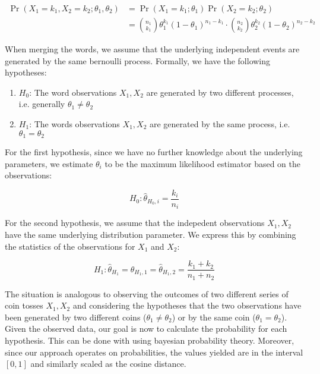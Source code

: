 \begin{equation*}
\begin{split}
	\Pr(X_1 = k_1, X_2 = k_2; \theta_1, \theta_2) &=
	\Pr(X_1=k_1;\theta_1)\Pr(X_2=k_2;\theta_2)
	\\
	&= 	\binom{n_1}{k_1}\theta_1^{k_1}(1-\theta_1)^{n_1-k_1} \cdot
	\binom{n_2}{k_2}\theta_2^{k_2}(1-\theta_2)^{n_2-k_2}
\end{split}
\end{equation*}

When merging the words, we assume that the underlying independent events are
generated by the same bernoulli process. Formally, we have the following hypotheses: 

\begin{enumerate}
  \item $H_0$: The word observations $X_1, X_2$ are generated by two different
  processes, i.e.  generally $\theta_1 \neq \theta_2$
  \item $H_1$: The words observations $X_1, X_2$ are generated by the same
  process, i.e. $\theta_1 = \theta_2$
\end{enumerate}

For the first hypothesis, since we have no further knowledge about the
underlying parameters, we estimate $\theta_i$ to be the maximum likelihood 
estimator based on the observations: 

\begin{equation*}
	H_0: \hat{\theta}_{H_0,i} = \frac{k_i}{n_i}
\end{equation*}

For the second hypothesis, we assume that the indepedent observations $X_1, X_2$
have the same underlying distribution parameter. We express this by combining
the statistics of the observations for $X_1$ and $X_2$:

\begin{equation*}
H_1: \hat{\theta}_{H_1} =\hat{\theta}_{H_1,1} =
\hat{\theta}_{H_1,2} =
\frac{k_1 + k_2}{n_1 + n_2}
\end{equation*}
 
The situation is analogous to observing the outcomes of two different series of
coin tosses $X_1, X_2$ and considering the hypotheses that the two
observations have been generated by two different coins ($\theta_1 \neq \theta_2$) or by the same coin
($\theta_1 = \theta_2$). Given the observed data, our goal is now to calculate
the probability for each hypothesis. This can be done with using bayesian probability theory.
Moreover, since our approach operates on probabilities, the values yielded are
in the interval $[0, 1]$ and similarly scaled as the cosine distance. 

